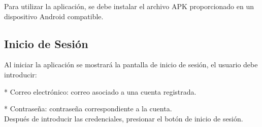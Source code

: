 \documentclass[12pt,a4paper]{article}
\begin{document}
Para utilizar la aplicación, se debe instalar el archivo APK
proporcionado en un dispositivo Android compatible.

\subsection{Inicio de Sesión}

Al iniciar la aplicación se mostrará la pantalla de inicio de sesión,
el usuario debe introducir:

* Correo electrónico: correo asociado a una cuenta registrada.

* Contraseña: contraseña correspondiente a la cuenta.\\
Después de introducir las credenciales, presionar el botón de inicio de sesión.
\end{document}
